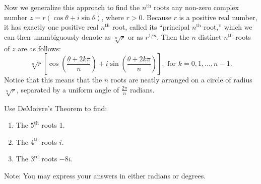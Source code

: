 \documentclass[space,nooutcomes]{ximera}
\begin{document}
Now we generalize this approach to find the $n^\text{th}$ roots any non-zero complex number $z=r(\cos\theta + i\sin\theta)$, where $r>0$.  Because $r$ is a positive real number, it has exactly one positive real $n^\text{th}$ root, called its ``principal $n^\text{th}$ root,'' which we can then unambiguously denote as $\sqrt[n]{r}$ or as $r^{1/n}$.  Then the $n$ distinct $n^\text{th}$ roots of $z$ are as follows: 
\[
\sqrt[n]{r}\left[\cos \left(\frac{\theta+2k\pi}{n}\right) 
+ i\sin \left(\frac{\theta+2k\pi}{n}\right)\right], \text{ for } k= 0, 1, \dots, n-1. 
\]
Notice that this means that the $n$ roots are neatly arranged on a circle of radius 
$\sqrt[n]{r}$, separated by a uniform angle of $\frac{2\pi}{n}$ radians.  

\begin{problem}
Use DeMoivre's Theorem to find: 
\begin{enumerate}
\item The $5^\text{th}$ roots 1.  
\item The $4^\text{th}$ roots $i$.  
\item The $3^\text{rd}$ roots $-8i$.  
\end{enumerate}
Note: You may express your answers in either radians or degrees.  
\end{problem}
\end{document}
